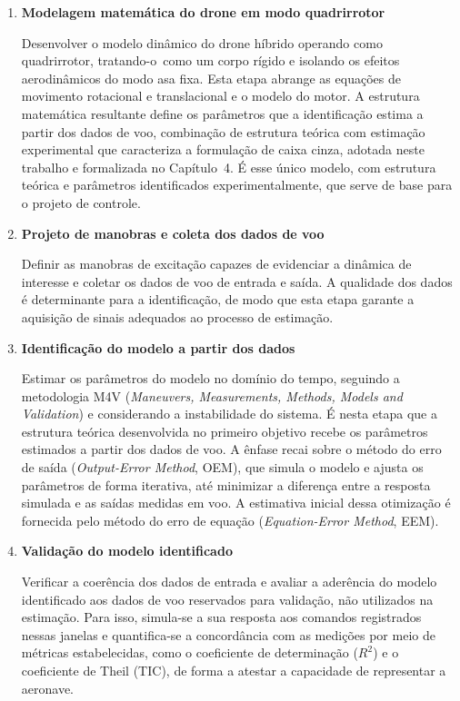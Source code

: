 \begin{enumerate}
    \item \textbf{Modelagem matemática do drone em modo quadrirrotor}

    Desenvolver o modelo dinâmico do drone híbrido operando como quadrirrotor, \mbox{tratando-o como} um corpo rígido e isolando os efeitos aerodinâmicos do modo asa fixa. Esta etapa abrange as equações de movimento rotacional e translacional e o modelo do motor. A estrutura matemática resultante define os parâmetros que a identificação estima a partir dos dados de voo, combinação de estrutura teórica com estimação experimental que caracteriza a formulação de caixa cinza, adotada neste trabalho e formalizada no Capítulo~4. É esse único modelo, com estrutura teórica e parâmetros identificados experimentalmente, que serve de base para o projeto de controle.

    \item \textbf{Projeto de manobras e coleta dos dados de voo}

    Definir as manobras de excitação capazes de evidenciar a dinâmica de interesse e coletar os dados de voo de entrada e saída. A qualidade dos dados é determinante para a identificação, de modo que esta etapa garante a aquisição de sinais adequados ao processo de estimação.

    \item \textbf{Identificação do modelo a partir dos dados}

    Estimar os parâmetros do modelo no domínio do tempo, seguindo a metodologia M4V (\textit{Maneuvers, Measurements, Methods, Models and Validation}) e considerando a instabilidade do sistema. É nesta etapa que a estrutura teórica desenvolvida no primeiro objetivo recebe os parâmetros estimados a partir dos dados de voo. A ênfase recai sobre o método do erro de saída (\textit{Output-Error Method}, OEM), que simula o modelo e ajusta os parâmetros de forma iterativa, até minimizar a diferença entre a resposta simulada e as saídas medidas em voo. A estimativa inicial dessa otimização é fornecida pelo método do erro de equação (\textit{Equation-Error Method}, EEM).

    \item \textbf{Validação do modelo identificado}

    Verificar a coerência dos dados de entrada e avaliar a aderência do modelo identificado aos dados de voo reservados para validação, não utilizados na estimação. Para isso, simula-se a sua resposta aos comandos registrados nessas janelas e quantifica-se a concordância com as medições por meio de métricas estabelecidas, como o coeficiente de determinação ($R^2$) e o coeficiente de Theil (TIC), de forma a atestar a capacidade de representar a aeronave.


\end{enumerate}
